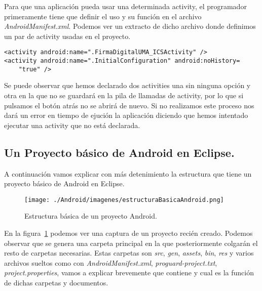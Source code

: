 Para que una aplicación pueda usar una determinada activity, el programador primeramente tiene que definir el uso y su función en el archivo \textit{AndroidManifest.xml}. Podemos ver un extracto de dicho archivo donde definimos un par de activity usadas en el proyecto.
\newpage
\begin{lstlisting}[style=XML]
<activity android:name=".FirmaDigitalUMA_ICSActivity" />
<activity android:name=".InitialConfiguration" android:noHistory=
	"true" />
\end{lstlisting}

Se puede observar que hemos declarado dos activities una sin ninguna opción y otra en la que no se guardará en la pila de llamadas de activity, por lo que si pulsamos el botón atrás no se abrirá de nuevo. Si no realizamos este proceso nos dará un error en tiempo de ejución la aplicación diciendo que hemos intentado ejecutar una activity que no está declarada.

\subsection{Un Proyecto básico de Android en Eclipse.}\label{cap:proyectoBasico}

A continuación vamos explicar con más detenimiento la estructura que tiene un proyecto básico de Android en Eclipse.

\begin{figure}
  \centering
    \texttt{[image: ./Android/imagenes/estructuraBasicaAndroid.png]}
  \caption{Estructura básica de un proyecto Android.}
  \label{fig:estructuraBasicaAndroid}
\end{figure}

En la figura~\ref{fig:estructuraBasicaAndroid} podemos ver una captura de un proyecto recién creado. Podemos observar que se genera una carpeta principal en la que posteriormente colgarán el resto de carpetas necesarias. Estas carpetas son \textit{src}, \textit{gen}, \textit{assets}, \textit{bin}, \textit{res} y varios archivos sueltos como con \textit{AndroidManifest.xml}, \textit{proguard-project.txt}, \textit{project.properties}, vamos a explicar brevemente que contiene y cual es la función de dichas carpetas y documentos.

